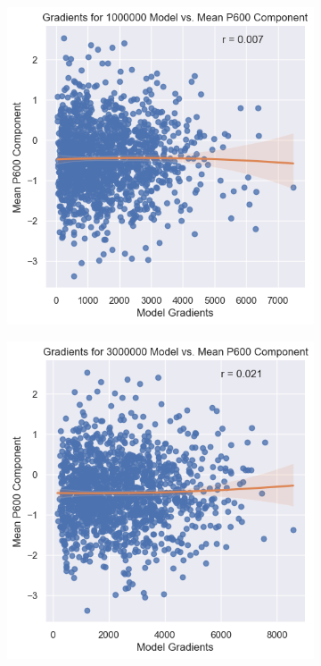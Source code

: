 \documentclass{IEEEtran}
\begin{document}
\begin{figure}[h]
    \centering
    \begin{subfigure}{0.4\textwidth}
        \centering
        \includegraphics[width=\textwidth]{gradients_vs_p600/1000000.png}
    \end{subfigure}
    \begin{subfigure}{0.4\textwidth}
        \centering
        \includegraphics[width=\textwidth]{gradients_vs_p600/3000000.png}
    \end{subfigure}
\end{figure}
\end{document}
